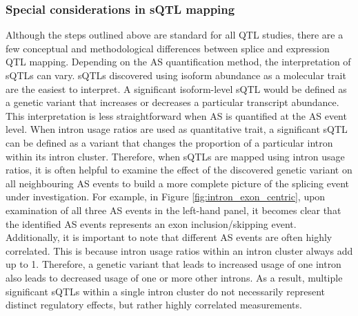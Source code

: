 \subsubsection{Special considerations in sQTL mapping}
Although the steps outlined above are standard for all QTL studies, there are a few conceptual and methodological differences between splice and expression QTL mapping. Depending on the AS quantification method, the interpretation of sQTLs can vary. sQTLs discovered using isoform abundance as a molecular trait are the easiest to interpret. A significant isoform-level sQTL would be defined as a genetic variant that increases or decreases a particular transcript abundance. This interpretation is less straightforward when AS is quantified at the AS event level. When intron usage ratios are used as quantitative trait, a significant sQTL can be defined as a variant that changes the proportion of a particular intron within its intron cluster. Therefore, when sQTLs are mapped using intron usage ratios, it is often helpful to examine the effect of the discovered genetic variant on all neighbouring AS events to build a more complete picture of the splicing event under investigation. For example, in Figure \ref{fig:intron_exon_centric}, upon examination of all three AS events in the left-hand panel, it becomes clear that the identified AS events represents an exon inclusion/skipping event. Additionally, it is important to note that different AS events are often highly correlated. This is because intron usage ratios within an intron cluster always add up to 1. Therefore, a genetic variant that leads to increased usage of one intron also leads to decreased usage of one or more other introns. As a result, multiple significant sQTLs within a single intron cluster do not necessarily represent distinct regulatory effects, but rather highly correlated measurements. 
